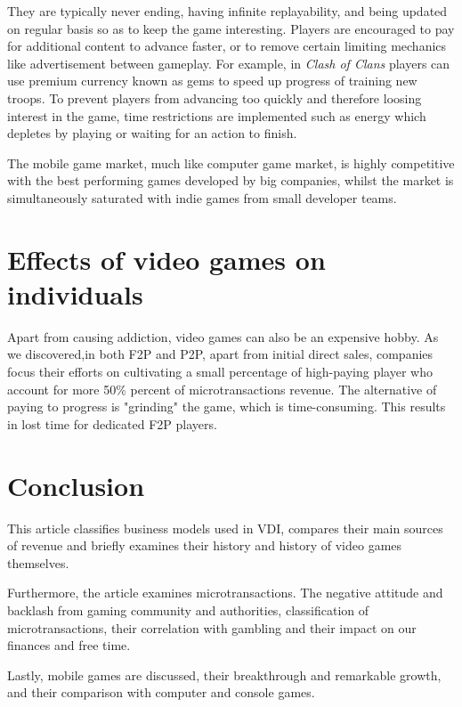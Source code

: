 \documentclass[10pt,british,a4paper,titlepage]{article}
\begin{document}
They are typically never ending, having infinite replayability, and being updated on regular basis so as to keep the game interesting. Players are encouraged to pay for additional content to advance faster, or to remove certain limiting mechanics like advertisement between gameplay. For example, in \emph{Clash of Clans} players can use premium currency known as gems to speed up progress of training new troops. To prevent players from advancing too quickly and therefore loosing interest in the game, time restrictions are implemented such as energy which depletes by playing or waiting for an action to finish\cite{mayra2020mobile:mob}. 

The mobile game market, much like computer game market, is highly competitive with the best performing games developed by big companies, whilst the market is simultaneously saturated with indie games from small developer teams.  

\section{Effects of video games on individuals}

Apart from causing addiction, video games can also be an expensive hobby. As we discovered,in both F2P and P2P, apart from initial direct sales, companies focus their efforts on cultivating a small percentage of high-paying player who account for more 50\% percent of microtransactions revenue. The alternative of paying to progress is "grinding" the game, which is time-consuming. This results in lost time for dedicated F2P players.   


\section{Conclusion}

This article classifies business models used in VDI, compares their main sources of revenue and briefly examines their history and history of video games themselves. 

Furthermore, the article examines microtransactions. The negative attitude and backlash from gaming community and authorities, classification of microtransactions, their correlation with gambling and their impact on our finances and free time.  

Lastly, mobile games are discussed, their breakthrough and remarkable growth, and their comparison with computer and console games.   






\end{document}
